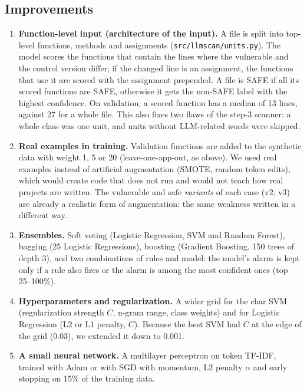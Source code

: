 \documentclass[11pt,a4paper]{article}
\newcommand{\code}[1]{\texttt{#1}}
\begin{document}
\subsection{Improvements}

\begin{enumerate}
  \item \textbf{Function-level input (architecture of the input).} A file is split into
        top-level functions, methods and assignments (\code{src/llmscan/units.py}). The model
        scores the functions that contain the lines where the vulnerable and the control
        version differ; if the changed line is an assignment, the functions that use it are
        scored with the assignment prepended. A file is SAFE if all its scored functions
        are SAFE, otherwise it gets the non-SAFE label with the highest confidence. On
        validation, a scored function has a median of 13 lines, against 27 for a whole
        file. This also fixes two flaws of the step-3 scanner: a whole class was one unit,
        and units without LLM-related words were skipped.
  \item \textbf{Real examples in training.} Validation functions are added to the
        synthetic data with weight 1, 5 or 20 (leave-one-app-out, as above). We used real
        examples instead of artificial augmentation (SMOTE, random token edits), which
        would create code that does not run and would not teach how real projects are
        written. The vulnerable and safe \emph{variants} of each case (v2, v3) are already
        a realistic form of augmentation: the same weakness written in a different way.
  \item \textbf{Ensembles.} Soft voting (Logistic Regression, SVM and Random Forest),
        bagging (25 Logistic Regressions), boosting (Gradient Boosting, 150 trees of
        depth 3), and two combinations of rules and model: the model's alarm is kept only
        if a rule also fires or the alarm is among the most confident ones (top 25--100\%).
  \item \textbf{Hyperparameters and regularization.} A wider grid for the char SVM
        (regularization strength $C$, n-gram range, class weights) and for Logistic
        Regression (L2 or L1 penalty, $C$). Because the best SVM had $C$ at the edge of the
        grid (0.03), we extended it down to 0.001.
  \item \textbf{A small neural network.} A multilayer perceptron on token TF-IDF, trained
        with Adam or with SGD with momentum, L2 penalty $\alpha$ and early stopping on 15\%
        of the training data.
\end{enumerate}
\end{document}
